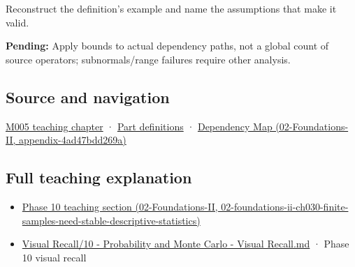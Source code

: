 Reconstruct the definition's example and name the assumptions that make it valid.

\textbf{Pending:} Apply bounds to actual dependency paths, not a global count of source operators; subnormals/range failures require other analysis.

\subsection{Source and navigation}\label{appendix-f82e270791c8-source-and-navigation}

\hyperref[01-foundations-i-ch001-when-arithmetic-meets-uncertainty]{M005 teaching chapter} · \hyperref[appendix-fd090d982a15-m005---parts-77-88]{Part definitions} · \href{../02-Foundations-II/main.pdf\#nameddest=appendix-4ad47bdd269a}{Dependency Map (02-Foundations-II, appendix-4ad47bdd269a)}

\subsection{Full teaching explanation}\label{appendix-f82e270791c8-full-teaching-explanation}

\begin{itemize}
\tightlist
\item
  \href{../02-Foundations-II/main.pdf\#nameddest=02-foundations-ii-ch030-finite-samples-need-stable-descriptive-statistics}{Phase 10 teaching section (02-Foundations-II, 02-foundations-ii-ch030-finite-samples-need-stable-descriptive-statistics)}
\item
  \hyperref[appendix-cb5af353ef77]{Visual Recall/10 - Probability and Monte Carlo - Visual Recall.md} · Phase 10 visual recall
\end{itemize}
